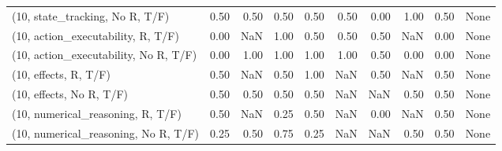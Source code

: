 \begin{table*}[h!]
\begin{adjustbox}{width=2\columnwidth,center}
\begin{tabular}{lrrr|rrr|rrr}
(10, state\_tracking, No R, T/F)       &                      0.50 &                  0.50 &                      0.50 &                          0.50 &                      0.50 &                          0.00 &                                   1.00 &                               0.50 &                                  None \\
(10, action\_executability, R, T/F)    &                      0.00 &                   NaN &                      1.00 &                          0.50 &                      0.50 &                          0.50 &                                    NaN &                               0.00 &                                  None \\
(10, action\_executability, No R, T/F) &                      0.00 &                  1.00 &                      1.00 &                          1.00 &                      1.00 &                          0.50 &                                   0.00 &                               0.00 &                                  None \\
(10, effects, R, T/F)                 &                      0.50 &                   NaN &                      0.50 &                          1.00 &                       NaN &                          0.50 &                                    NaN &                               0.50 &                                  None \\
(10, effects, No R, T/F)              &                      0.50 &                  0.50 &                      0.50 &                          0.50 &                       NaN &                           NaN &                                   0.50 &                               0.50 &                                  None \\
(10, numerical\_reasoning, R, T/F)     &                      0.50 &                   NaN &                      0.25 &                          0.50 &                       NaN &                          0.00 &                                    NaN &                               0.50 &                                  None \\
(10, numerical\_reasoning, No R, T/F)  &                      0.25 &                  0.50 &                      0.75 &                          0.25 &                       NaN &                           NaN &                                   0.50 &                               0.50 &                                  None \\

\end{tabular}
\end{adjustbox}
\end{table*}
